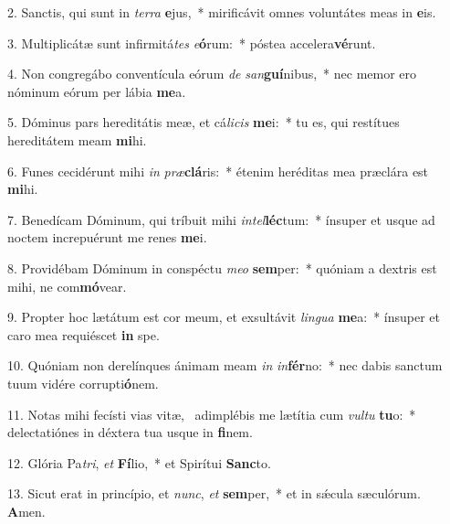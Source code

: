 2. Sanctis, qui sunt in \textit{ter}\textit{ra} \textbf{e}jus,~*  mirificávit omnes voluntátes meas in \textbf{e}is.\

3. Multiplicátæ sunt infirmitá\textit{tes} \textit{e}\textbf{ó}rum:~*  póstea accelera\textbf{vé}runt.\

4. Non congregábo conventícula eórum \textit{de} \textit{san}\textbf{guí}nibus,~*  nec memor ero nóminum eórum per lábia \textbf{me}a.\

5. Dóminus pars hereditátis meæ, et cá\textit{li}\textit{cis} \textbf{me}i:~*  tu es, qui restítues hereditátem meam \textbf{mi}hi.\

6. Funes cecidérunt mihi \textit{in} \textit{præ}\textbf{clá}ris:~*  étenim heréditas mea præclára est \textbf{mi}hi.\

7. Benedícam Dóminum, qui tríbuit mihi \textit{in}\textit{tel}\textbf{léc}tum:~*  ínsuper et usque ad noctem increpuérunt me renes \textbf{me}i.\

8. Providébam Dóminum in conspéctu \textit{me}\textit{o} \textbf{sem}per:~*  quóniam a dextris est mihi, ne com\textbf{mó}vear.\

9. Propter hoc lætátum est cor meum, et exsultávit \textit{lin}\textit{gua} \textbf{me}a:~*  ínsuper et caro mea requiéscet \textbf{in} spe.\

10. Quóniam non derelínques ánimam meam \textit{in} \textit{in}\textbf{fér}no:~*  nec dabis sanctum tuum vidére corrupti\textbf{ó}nem.\

11. Notas mihi fecísti vias vitæ, \dag\  adimplébis me lætítia cum \textit{vul}\textit{tu} \textbf{tu}o:~*  delectatiónes in déxtera tua usque in \textbf{fi}nem.\

12. Glória Pa\textit{tri}, \textit{et} \textbf{Fí}lio,~*  et Spirítui \textbf{Sanc}to.\

13. Sicut erat in princípio, et \textit{nunc}, \textit{et} \textbf{sem}per,~*  et in sǽcula sæculórum. \textbf{A}men.\

